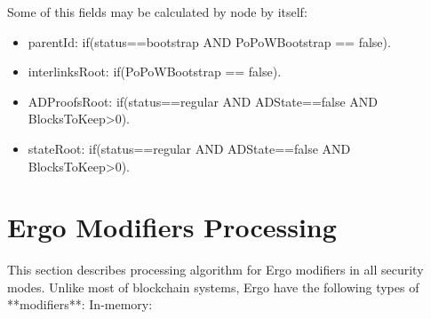 \documentclass[]{report}   %
\begin{document}
\vspace{1em}
Some of this fields may be calculated by node by itself: 

  
   \begin{itemize}
     \item parentId: if(status==bootstrap AND PoPoWBootstrap == false).
     \item interlinksRoot: if(PoPoWBootstrap == false).
     \item ADProofsRoot: if(status==regular AND ADState==false AND BlocksToKeep>0).
     \item stateRoot: if(status==regular AND ADState==false AND BlocksToKeep>0).
     \end{itemize}
     

\section{Ergo Modifiers Processing}
This section describes processing algorithm for Ergo modifiers in all security modes. Unlike most of blockchain systems, Ergo have the following types of **modifiers**: In-memory:
\end{document}
